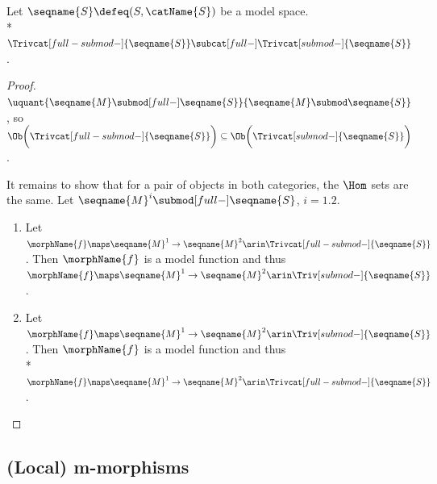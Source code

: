 \documentclass{article}
\begin{document}
\begin{lemma}
\label{lem:modtrivcat}

Let $\seqname{S} \defeq (S, \catName{S})$ be a model space. \\*
\nobreaks
  {{
    $
      \Trivcat[full-submod-]{\seqname{S}} \subcat[full-]
      \Trivcat[submod-]{\seqname{S}}
    $.
  }}

\begin{proof}
$
  \uquant
    {\seqname{M} \submod[full-] \seqname{S}}
    {\seqname{M} \submod \seqname{S}}
$,
so
$
  \Ob \biggl ( \Trivcat[full-submod-]{\seqname{S}} \biggr ) \subseteq
  \Ob \biggl ( \Trivcat[submod-]{\seqname{S}} \biggr )
$.

It remains to show that for a pair of objects in both categories, the $\Hom$ sets are the same.
Let $\seqname{M}^i \submod[full-] \seqname{S}$, $i=1.2$.
\begin{enumerate}
\item
Let
$
  \morphName{f} \maps \seqname{M}^1 \to \seqname{M}^2 \arin
  \Trivcat[full-submod-]{\seqname{S}}
$.
Then $\morphName{f}$ is a model function and thus
$
  \morphName{f} \maps \seqname{M}^1 \to \seqname{M}^2 \arin
  \Triv[submod-]{\seqname{S}}
$.
\item
Let
$
  \morphName{f} \maps \seqname{M}^1 \to \seqname{M}^2 \arin
  \Triv[submod-]{\seqname{S}}
$.
Then $\morphName{f}$ is a model function and thus \\*
$
  \morphName{f} \maps \seqname{M}^1 \to \seqname{M}^2 \arin
  \Trivcat[full-submod-]{\seqname{S}}
$.
\end{enumerate}

\end{proof}
\end{lemma}

\subsection{(Local) m-morphisms}
\end{document}
